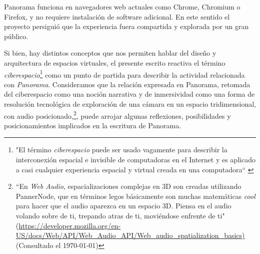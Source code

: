 
Panorama funciona en navegadores web actuales como Chrome, Chromium o Firefox, y no requiere instalación de software adicional. En este sentido el proyecto persiguió que la experiencia fuera compartida y explorada por un gran público.  



  


Si bien, hay distintos conceptos que nos permiten hablar del diseño y arquitectura de espacios virtuales, el presente escrito reactiva el término \emph{ciberespacio}\footnote{"El término \emph{ciberespacio} puede ser usado vagamente para describir la interconexión espacial e invisible de computadoras en el Internet y es aplicado a casi cualquier experiencia espacial y virtual creada en una computadora`` \citep{cyberspace}} como un punto de partida para describir la actividad relacionada con \textit{Panorama}. Consideramos que la relación expresada en Panorama, retomada del ciberespacio como una noción narrativa y de inmersividad como una forma de resolución tecnológica de exploración de una cámara en un espacio tridimensional, con audio posicionado,\footnote{``En \textit{Web Audio}, espacializaciones complejas en 3D son creadas utilizando PannerNode, que en términos legos básicamente son muchas matemáticas \textit{cool} para hacer que el audio aparezca en un espacio 3D. Piensa en el audio volando sobre de ti, trepando atras de ti, moviéndose enfrente de ti" (\url{https://developer.mozilla.org/en-US/docs/Web/API/Web_Audio_API/Web_audio_spatialization_basics)} (Consultado el \today)}, puede arrojar algunas reflexiones, posibilidades y posicionamientos implicados en la escritura de Panorama. %
\color{black}


